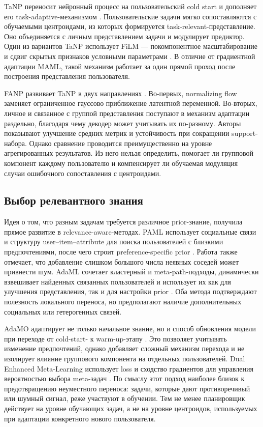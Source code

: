 \documentclass[12pt,a4paper]{article}
\begin{document}
TaNP переносит нейронный процесс на пользовательский cold start и дополняет
его task-adaptive-механизмом \citep{lin2021tanp}. Пользовательские задачи
мягко сопоставляются с обучаемыми центроидами, из которых формируется
task-relevant-представление. Оно объединяется с личным представлением задачи и
модулирует предиктор. Один из вариантов TaNP использует FiLM --- покомпонентное
масштабирование и сдвиг скрытых признаков условными параметрами
\citep{perez2018film}. В отличие от градиентной адаптации MAML, такой механизм
работает за один прямой проход после построения представления пользователя.

FANP развивает TaNP в двух направлениях \citep{lin2024fanp}. Во-первых,
normalizing flow заменяет ограниченное гауссово приближение латентной
переменной. Во-вторых, личное и связанное с группой представления поступают в
механизм адаптации раздельно, благодаря чему декодер может учитывать их
по-разному. Авторы показывают улучшение средних метрик и устойчивость при
сокращении support-набора. Однако сравнение проводится преимущественно на
уровне агрегированных результатов. Из него нельзя определить, помогает ли
групповой компонент каждому пользователю и компенсирует ли обучаемая
модуляция случаи ошибочного сопоставления с центроидами.

\subsection{Выбор релевантного знания}

Идея о том, что разным задачам требуется различное prior-знание, получила
прямое развитие в relevance-aware-методах. PAML использует социальные связи и
структуру user--item--attribute для поиска пользователей с близкими
предпочтениями, после чего строит preference-specific prior
\citep{wang2021paml}. Работа также отмечает, что добавление слишком большого
числа неявных соседей может привнести шум. AdaML сочетает кластерный и
meta-path-подходы, динамически взвешивает найденных связанных пользователей и
использует их как для улучшения представления, так и для настройки prior
\citep{xu2023adaml}. Оба метода подтверждают полезность локального переноса,
но предполагают наличие дополнительных социальных или гетерогенных связей.

AdaMO адаптирует не только начальное знание, но и способ обновления модели при
переходе от cold-start- к warm-up-этапу \citep{adamo2024}. Это позволяет
учитывать изменение предпочтений, однако добавляет сложный механизм перехода
и не изолирует влияние группового компонента на отдельных пользователей.
Dual Enhanced Meta-Learning использует loss и сходство градиентов для
управления вероятностью выбора meta-задач \citep{dualmeta2025}. По смыслу этот
подход наиболее близок к предотвращению неуместного переноса: задачи, которые
дают противоречивый или шумный сигнал, реже участвуют в обучении. Тем не менее
планировщик действует на уровне обучающих задач, а не на уровне центроидов,
используемых при адаптации конкретного нового пользователя.
\end{document}
